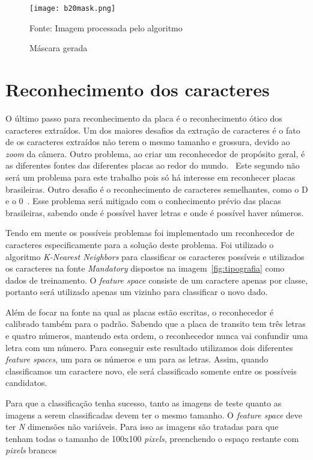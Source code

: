 \begin{figure}[H]
	\centering
	\texttt{[image: b20mask.png]}
	\caption{Máscara gerada}
Fonte: Imagem processada pelo algoritmo
	\label{fig:mascara}
\end{figure}

\section{Reconhecimento dos caracteres} \label{sec:reconhecimento}

O último passo para reconhecimento da placa é o reconhecimento ótico dos
caracteres extraídos. Um dos maiores desafios da extração de caracteres é o fato de
os caracteres extraídos não terem o mesmo tamanho e grossura, devido ao
\emph{zoom} da câmera. Outro problema, ao criar um reconhecedor de propósito
geral, é as diferentes fontes das diferentes placas ao redor do mundo.~\cite{s2013automatic}
Este segundo não será um problema para este trabalho pois
só há interesse em reconhecer placas brasileiras. Outro desafio é o
reconhecimento de caracteres semelhantes, como o D e o
0~\cite{ho2016intelligent}.  Esse problema será mitigado com o conhecimento
prévio das placas brasileiras, sabendo onde é possível haver letras e onde é
possível haver números.

Tendo em mente os possíveis problemas foi implementado um reconhecedor de caracteres especificamente para a solução deste problema. Foi utilizado o algoritmo \emph{K-Nearest Neighbors} para classificar os caracteres possíveis e utilizados os caracteres na fonte \emph{Mandatory} dispostos na imagem~\ref{fig:tipografia} como dados de treinamento. O \emph{feature space} consiste de um caractere apenas por classe, portanto será utilizado apenas um vizinho para classificar o novo dado.

Além de focar na fonte na qual as placas estão escritas, o reconhecedor é calibrado também para o padrão. Sabendo que a placa de transito tem três letras e quatro números, mantendo esta ordem, o reconhecedor nunca vai confundir uma letra com um número. Para conseguir este resultado utilizamos dois diferentes \emph{feature spaces}, um para os números e um para as letras. Assim, quando classificamos um caractere novo, ele será classificado somente entre os possíveis candidatos.

Para que a classificação tenha sucesso, tanto as imagens de teste quanto as imagens a serem classificadas devem ter o mesmo tamanho. O \emph{feature space} deve ter \emph{N} dimensões não variáveis. Para isso as imagens são tratadas para que tenham todas o tamanho de 100x100 \emph{pixels}, preenchendo o espaço restante com \emph{pixels} brancos

